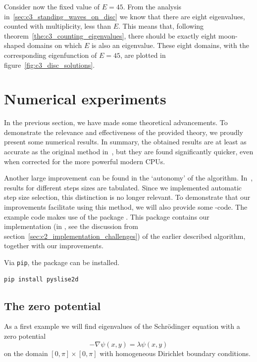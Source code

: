 Consider now the fixed value of $E = 45$. From the analysis in~\ref{sec:c3_standing_waves_on_disc} we know that there are eight eigenvalues, counted with multiplicity, less than $E$. This means that, following theorem~\ref{the:c3_counting_eigenvalues}, there should be exactly eight moon-shaped domains on which $E$ is also an eigenvalue. These eight domains, with the corresponding eigenfunction of $E = 45$, are plotted in figure~\ref{fig:c3_disc_solutions}.

\section{Numerical experiments}\label{sec:c3_experiments}

In the previous section, we have made some theoretical advancements. To demonstrate the relevance and effectiveness of the provided theory, we proudly present some numerical results. In summary, the obtained results are at least as accurate as the original method in~\cite{ixaru_new_2010}, but they are found significantly quicker, even when corrected for the more powerful modern CPUs.

Another large improvement can be found in the `autonomy' of the algorithm. In~\cite{ixaru_new_2010}, results for different steps sizes are tabulated. Since we implemented automatic step size selection, this distinction is no longer relevant. To demonstrate that our improvements facilitate using this method, we will also provide some \lpython{}-code. The example code makes use of the package \pyslisetd{}. This package contains our implementation (in \cpp{}, see the discussion from section~\ref{sec:c2_implementation_challenges}) of the earlier described algorithm, together with our improvements.

Via \texttt{pip}, the package \pyslisetd{} can be installed.
\begin{verbatim}
pip install pyslise2d
\end{verbatim}

\subsection{The zero potential}\label{sec:c3_experiments_zero}

As a first example we will find eigenvalues of the Schrödinger equation with a zero potential
$$
  -\nabla \psi(x, y) = \lambda \psi(x, y)
$$
on the domain $[0, \pi] \times [0, \pi]$ with homogeneous Dirichlet boundary conditions.

